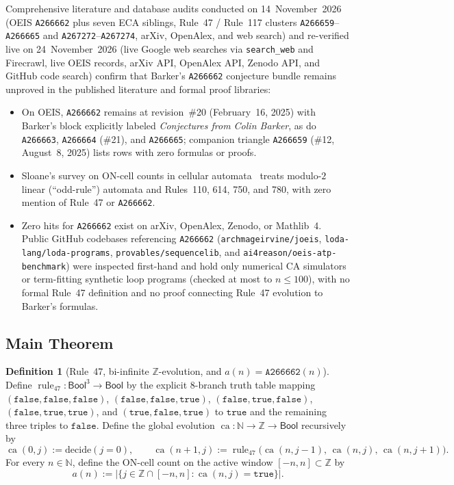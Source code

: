 \documentclass[11pt]{article}
\theoremstyle{definition}
\newtheorem{definition}[theorem]{Definition}
\newcommand{\N}{\mathbb{N}}
\newcommand{\Z}{\mathbb{Z}}
\newcommand{\seq}[1]{\texttt{#1}}
\newcommand{\ruleFS}{\operatorname{rule}_{47}}
\newcommand{\ca}{\operatorname{ca}}
\begin{document}
Comprehensive literature and database audits conducted on 14~November~2026 (OEIS \seq{A266662} plus seven ECA siblings, Rule~47 / Rule~117 clusters \seq{A266659}--\seq{A266665} and \seq{A267272}--\seq{A267274}, arXiv, OpenAlex, and web search) and re-verified live on 24~November~2026 (live Google web searches via \texttt{search\_web} and Firecrawl, live OEIS records, arXiv API, OpenAlex API, Zenodo API, and GitHub code search) confirm that Barker's \seq{A266662} conjecture bundle remains unproved in the published literature and formal proof libraries:
\begin{itemize}
\item On OEIS, \seq{A266662} remains at revision~\#20 (February~16, 2025) with Barker's block explicitly labeled \emph{Conjectures from Colin Barker}, as do \seq{A266663}, \seq{A266664} (\#21), and \seq{A266665}; companion triangle \seq{A266659} (\#12, August~8, 2025) lists rows with zero formulas or proofs.
\item Sloane's survey on ON-cell counts in cellular automata~\cite{sloane2015} treats modulo-$2$ linear (``odd-rule'') automata and Rules~110, 614, 750, and 780, with zero mention of Rule~47 or \seq{A266662}.
\item Zero hits for \seq{A266662} exist on arXiv, OpenAlex, Zenodo, or Mathlib~4. Public GitHub codebases referencing \seq{A266662} ({\small\nolinkurl{archmageirvine/joeis}}, {\small\nolinkurl{loda-lang/loda-programs}}, {\small\nolinkurl{provables/sequencelib}}, and {\small\nolinkurl{ai4reason/oeis-atp-benchmark}}) were inspected first-hand and hold only numerical CA simulators or term-fitting synthetic loop programs (checked at most to $n \le 100$), with no formal Rule~47 definition and no proof connecting Rule~47 evolution to Barker's formulas.
\end{itemize}

\subsection{Main Theorem}

\begin{definition}[Rule~47, bi-infinite $\Z$-evolution, and $a(n) = \seq{A266662}(n)$]
\label{def:c053}
Define $\ruleFS : \mathsf{Bool}^3 \to \mathsf{Bool}$ by the explicit $8$-branch truth table mapping $(\mathtt{false}, \mathtt{false}, \mathtt{false})$, $(\mathtt{false}, \mathtt{false}, \mathtt{true})$, $(\mathtt{false}, \mathtt{true}, \mathtt{false})$, $(\mathtt{false}, \mathtt{true}, \mathtt{true})$, and $(\mathtt{true}, \mathtt{false}, \mathtt{true})$ to $\mathtt{true}$ and the remaining three triples to $\mathtt{false}$. Define the global evolution $\ca : \N \to \Z \to \mathsf{Bool}$ recursively by
\[
\ca(0, j) := \mathrm{decide}(j = 0), \qquad
\ca(n + 1, j) := \ruleFS\bigl(\ca(n, j - 1),\, \ca(n, j),\, \ca(n, j + 1)\bigr).
\]
For every $n \in \N$, define the ON-cell count on the active window $[-n, n] \subset \Z$ by
\[
a(n) := \bigl|\{j \in \Z \cap [-n, n] : \ca(n, j) = \mathtt{true}\}\bigr|.
\]
\end{definition}
\end{document}

